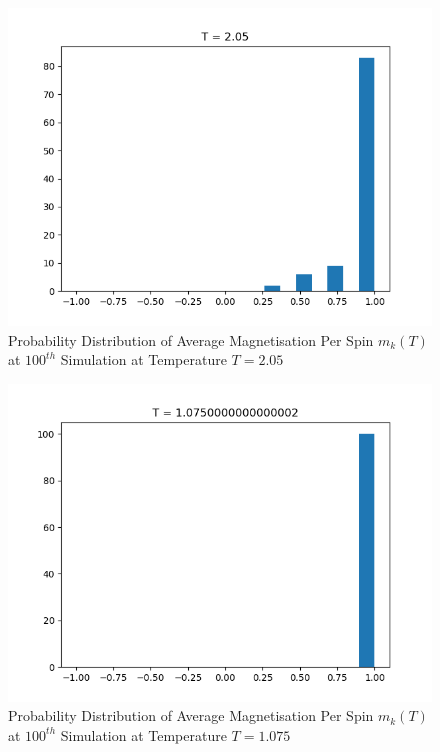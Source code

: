 \documentclass[a4paper]{article}
\numberwithin{equation}{section}
\begin{document}
\begin{figure}[H]
	\centering
	\includegraphics[scale=0.7]{probdist3.png}
	\caption{Probability Distribution of Average Magnetisation Per Spin $m_k(T)$ at $100^{th}$ Simulation at Temperature $T=2.05$}
	\label{fig:probdist3}
\end{figure}
\begin{figure}[H]
	\centering
	\includegraphics[scale=0.7]{probdist4.png}
	\caption{Probability Distribution of Average Magnetisation Per Spin $m_k(T)$ at $100^{th}$ Simulation at Temperature $T=1.075$}
	\label{fig:probdist4}
\end{figure}
\end{document}
